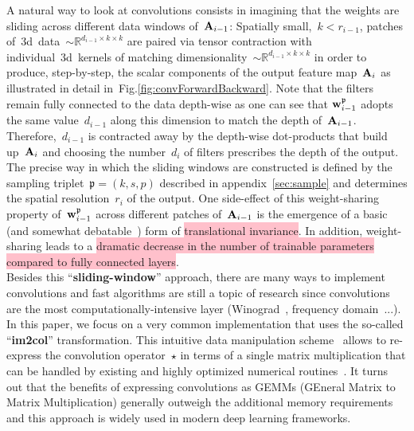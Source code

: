 \documentclass{article}
\begin{document}
\noindent A natural way to look at convolutions consists in imagining that the weights are sliding across different data windows of~${\bf A}_{i-1}$:  Spatially small,~$k<r_{i-1}$, patches of~3d~data~$\sim \mathbb{R}^{d_{i-1}\times k\times k}$ are paired via tensor contraction with individual~3d~kernels of matching dimensionality~$\sim \mathbb{R}^{d_{i-1}\times k\times k}$ in order to produce, step-by-step, the scalar components of the output feature map~${\bf A}_i$ as illustrated in detail in~Fig.\ref{fig:convForwardBackward}.  Note that the filters remain fully connected to the data depth-wise as one can see that ${\bf w}_{i-1}^\mathfrak{p}$ adopts the same value~$d_{i-1}$ along this dimension to match the depth of~${\bf A}_{i-1}$.  Therefore,~$d_{i-1}$ is contracted away by the depth-wise dot-products that build up~${\bf A}_i$ and choosing the number~$d_i$ of filters prescribes the depth of the output. The precise way in which the sliding windows are constructed is defined by the sampling triplet~$\mathfrak{p} = (k,s,p)$ described in appendix~\ref{sec:sample} and determines the spatial resolution~$r_i$ of the output. One side-effect of this weight-sharing property of~${\bf w}_{i-1}^\mathfrak{p}$ across different patches of~${\bf A}_{i-1}$ is the emergence of a basic (and somewhat debatable~\cite{invarianceBrittle}) form of \colorbox{pink}{translational invariance}. In addition, weight-sharing leads to a \colorbox{pink}{dramatic decrease in the number of trainable parameters compared to fully connected layers}. \\

\noindent Besides this ``{\bf sliding-window}'' approach, there are many ways to implement convolutions and fast algorithms are still a topic of research since convolutions are the most computationally-intensive layer (Winograd~\cite{winograd}, frequency domain~\cite{convFFT}...).  In this paper, we focus on a very common implementation that uses the so-called ``{\bf im2col}'' transformation.  This intuitive data manipulation scheme~\cite{wikiConv, convUnroll} allows to re-express the convolution operator~$\star$ in terms of a single matrix multiplication that can be handled by existing and highly optimized numerical routines~\cite{blas, cuDNN}.  It turns out that the benefits of expressing convolutions as GEMMs (GEneral Matrix to Matrix Multiplication) generally outweigh the additional memory requirements and this approach is widely used in modern deep learning frameworks.
\end{document}
